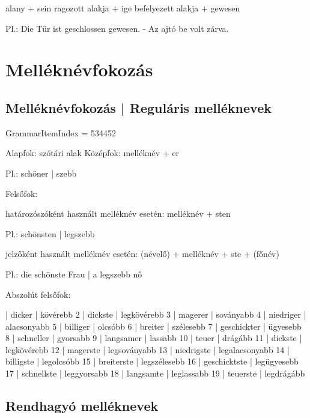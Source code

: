 \documentclass{article}
\newenvironment{desc}{\verbatim}{\endverbatim}
\newenvironment{exmp}{\verbatim}{\endverbatim}
\begin{document}
\begin{desc}
alany + sein ragozott alakja + ige befelyezett alakja + gewesen

Pl.: Die Tür ist geschlossen gewesen. - Az ajtó be volt zárva.
\end{desc}

\section{Melléknévfokozás}

\subsection{Melléknévfokozás | Reguláris melléknevek}

GrammarItemIndex = 534452

\begin{desc}

\begin{enumerate}
Alapfok: szótári alak
Középfok: melléknév + er

Pl.: schöner | szebb

Felsőfok:
\begin{enumerate}
határozószóként használt melléknév esetén: melléknév + sten

Pl.: schönsten | legszebb

jelzőként használt melléknév esetén: (névelő) + melléknév + ste + (főnév)

Pl.: die schönste Frau | a legszebb nő
\end{enumerate}

Abszolút felsőfok:
\end{enumerate}
\end{desc}

\begin{exmp}
1 | dicker | kövérebb
2 | dickste | legkövérebb
3 | magerer | soványabb
4 | niedriger | alacsonyabb
5 | billiger | olcsóbb
6 | breiter | szélesebb
7 | geschickter | ügyesebb
8 | schneller | gyorsabb
9 | langsamer | lassabb
10 | teuer | drágább
11 | dickste | legkövérebb
12 | magerste | legsoványabb
13 | niedrigste | legalacsonyabb
14 | billigste | legolcsóbb
15 | breiterste | legszélesebb
16 | geschicktste | legügyesebb
17 | schnellste | leggyorsabb
18 | langsamte | leglassabb
19 | teuerste | legdrágább
\end{exmp}

\subsection{Rendhagyó melléknevek}
\end{document}
